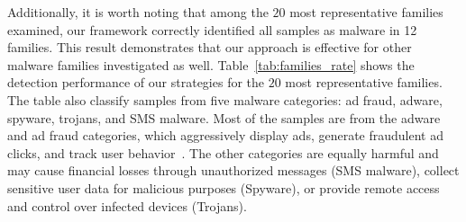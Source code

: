 Additionally, it is worth noting that among the $20$ most representative families examined, our framework correctly identified all samples as malware in 12 families. This result demonstrates that our approach is effective for other malware families investigated as well. Table~\ref{tab:families_rate} shows the detection performance of our strategies for the $20$ most representative families. The table also classify samples from five malware categories: ad fraud, adware, spyware, trojans, and SMS malware. Most of the samples are from the adware and ad fraud categories, which aggressively display ads, generate fraudulent ad clicks, and track user behavior~\cite{DBLP:journals/spe/FallahB22}. The other categories are equally harmful and may cause financial losses through unauthorized messages (SMS malware), collect sensitive user data for malicious purposes (Spyware), or provide remote access and control over infected devices (Trojans).



\begin{table}[h]
  \caption{Detection Rate of the $20$ most representative Families from $30\%$ tested randomly selected from \fds.}
  \label{tab:families_rate}
\end{table}



